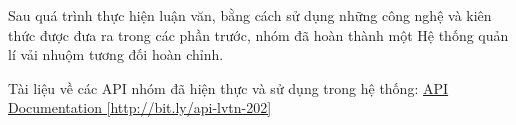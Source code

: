 Sau quá trình thực hiện luận văn, bằng cách sử dụng những công nghệ và kiên thức được đưa ra trong các phần trước, nhóm đã hoàn thành một Hệ thống quản lí vải nhuộm tương đối hoàn chỉnh.\par

Tài liệu về các API nhóm đã hiện thực và sử dụng trong hệ thống: \href{http://bit.ly/api-lvtn-202}{API Documentation [http://bit.ly/api-lvtn-202]}